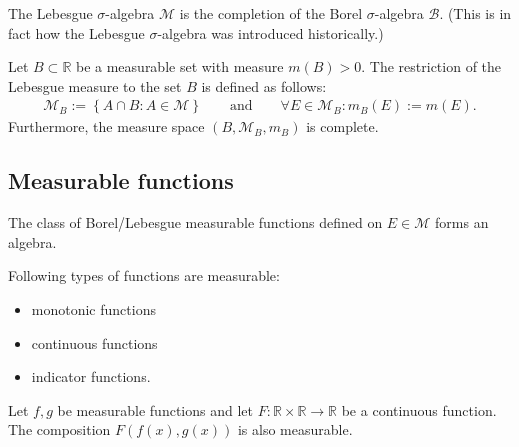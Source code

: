     \begin{property}\label{lebesgue:completion_remark}
        The Lebesgue $\sigma$-algebra $\mathcal{M}$ is the completion of the Borel $\sigma$-algebra $\mathcal{B}$. (This is in fact how the Lebesgue $\sigma$-algebra was introduced historically.)
    \end{property}

    \begin{construct}[Restriction]\label{lebesgue:restricted_lebesgue_measure}
        Let $B\subset\mathbb{R}$ be a measurable set with measure $m(B)>0$. The restriction of the Lebesgue measure to the set $B$ is defined as follows:
        \begin{gather}
            \mathcal{M}_B := \left\{A\cap B:A\in\mathcal{M}\right\}\qquad\text{and}\qquad\forall E\in\mathcal{M}_B:m_B(E) := m(E).
        \end{gather}
        Furthermore, the measure space $(B,\mathcal{M}_B,m_B)$ is complete.
    \end{construct}

\subsection{Measurable functions}


    \begin{property}
        The class of Borel/Lebesgue measurable functions defined on $E\in\mathcal{M}$ forms an algebra.
    \end{property}

    \begin{example}
        Following types of functions are measurable:
        \begin{itemize}
            \item monotonic functions
            \item continuous functions
            \item indicator functions.
        \end{itemize}
    \end{example}
    \begin{result}
        Let $f,g$ be measurable functions and let $F:\mathbb{R}\times\mathbb{R}\rightarrow\mathbb{R}$ be a continuous function. The composition $F(f(x), g(x))$ is also measurable.
    \end{result}

